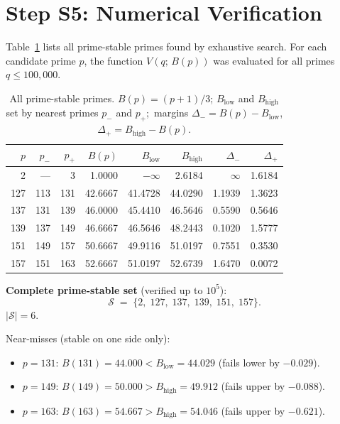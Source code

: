 \documentclass[12pt,a4paper]{article}
\theoremstyle{definition}
\theoremstyle{remark}
\begin{document}
\section{Step S5: Numerical Verification}
\label{sec:pss:s5}

Table~\ref{tab:pss:stable} lists all prime-stable primes found by exhaustive
search.  For each candidate prime $p$, the function $V(q;\,B(p))$ was evaluated
for all primes $q \leq 100{,}000$.

\begin{table}[h]
\centering
\caption{All prime-stable primes.  $B(p)=(p+1)/3$;\;
         $B_{\mathrm{low}}$ and $B_{\mathrm{high}}$ set by nearest primes
         $p_-$ and $p_+$;\ margins $\Delta_- = B(p)-B_{\mathrm{low}}$,\;
         $\Delta_+ = B_{\mathrm{high}}-B(p)$.}
\label{tab:pss:stable}
\begin{tabular}{rrrrrrrr}
\toprule
$p$ & $p_-$ & $p_+$ & $B(p)$ & $B_{\mathrm{low}}$ & $B_{\mathrm{high}}$ & $\Delta_-$ & $\Delta_+$ \\
\midrule
  2 & ---   &   3 & 1.0000 & $-\infty$ & 2.6184 & $\infty$ & 1.6184 \\
127 & 113   & 131 & 42.6667 & 41.4728 & 44.0290 & 1.1939 & 1.3623 \\
137 & 131   & 139 & 46.0000 & 45.4410 & 46.5646 & 0.5590 & 0.5646 \\
139 & 137   & 149 & 46.6667 & 46.5646 & 48.2443 & 0.1020 & 1.5777 \\
151 & 149   & 157 & 50.6667 & 49.9116 & 51.0197 & 0.7551 & 0.3530 \\
157 & 151   & 163 & 52.6667 & 51.0197 & 52.6739 & 1.6470 & 0.0072 \\
\bottomrule
\end{tabular}
\end{table}

\begin{resultbox}
\textbf{Complete prime-stable set} (verified up to $10^5$):
\[
  \mathcal{S} \;=\; \{2,\;127,\;137,\;139,\;151,\;157\}.
\]
$|\mathcal{S}| = 6$.
\end{resultbox}

Near-misses (stable on one side only):
\begin{itemize}
  \item $p = 131$: $B(131) = 44.000 < B_{\mathrm{low}} = 44.029$ (fails lower by $-0.029$).
  \item $p = 149$: $B(149) = 50.000 > B_{\mathrm{high}} = 49.912$ (fails upper by $-0.088$).
  \item $p = 163$: $B(163) = 54.667 > B_{\mathrm{high}} = 54.046$ (fails upper by $-0.621$).
\end{itemize}
\end{document}
